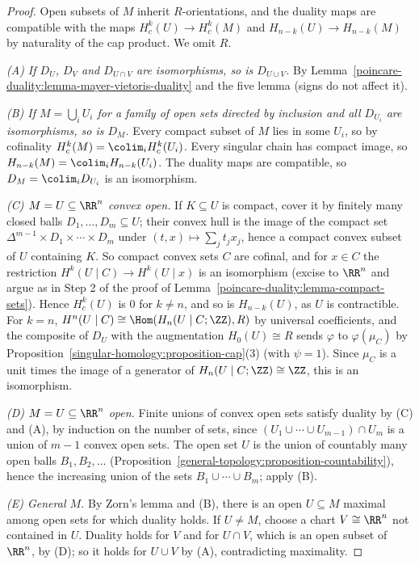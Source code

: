 \begin{proof}
Open subsets of $M$ inherit $R$-orientations, and the duality maps are compatible with the maps $H^k_c(U) \to H^k_c(M)$ and $H_{n-k}(U) \to H_{n-k}(M)$ by naturality of
the cap product. We omit $R$.

\emph{(A) If $D_U$, $D_V$ and $D_{U \cap V}$ are isomorphisms, so is $D_{U \cup V}$.} By Lemma~\ref{poincare-duality:lemma-mayer-vietoris-duality} and the five lemma (signs do
not affect it).

\emph{(B) If $M = \bigcup_i U_i$ for a family of open sets directed by inclusion and all $D_{U_i}$ are isomorphisms, so is $D_M$.} Every compact subset of $M$ lies in some
$U_i$, so by cofinality $H^k_c(M) = \colim_i H^k_c(U_i)$. Every singular chain has compact image, so $H_{n-k}(M) = \colim_i H_{n-k}(U_i)$. The duality maps are compatible,
so $D_M = \colim_i D_{U_i}$ is an isomorphism.

\emph{(C) $M = U \subseteq \RR^n$ convex open.} If $K \subseteq U$ is compact, cover it by finitely many closed balls $D_1, \ldots, D_m \subseteq U$; their convex hull is the image of the
compact set $\Delta^{m-1} \times D_1 \times \cdots \times D_m$ under $(t, x) \mapsto \sum_j t_jx_j$, hence a compact convex subset of $U$ containing $K$. So compact convex sets $C$ are
cofinal, and for $x \in C$ the restriction $H^k(U \mid C) \to H^k(U \mid x)$ is an isomorphism (excise to $\RR^n$ and argue as in Step 2 of the proof of
Lemma~\ref{poincare-duality:lemma-compact-sets}). Hence $H^k_c(U)$ is $0$ for $k \neq n$, and so is $H_{n-k}(U)$, as $U$ is contractible. For $k = n$, $H^n(U \mid C) \cong \Hom(H_n(U \mid C; \ZZ), R)$
by universal coefficients, and the composite of $D_U$ with the augmentation $H_0(U) \cong R$ sends $\varphi$ to $\varphi(\mu_C)$ by Proposition~\ref{singular-homology:proposition-cap}(3)
(with $\psi = 1$). Since $\mu_C$ is a unit times the image of a generator of $H_n(U \mid C; \ZZ) \cong \ZZ$, this is an isomorphism.

\emph{(D) $M = U \subseteq \RR^n$ open.} Finite unions of convex open sets satisfy duality by (C) and (A), by induction on the number of sets, since
$(U_1 \cup \cdots \cup U_{m-1}) \cap U_m$ is a union of $m - 1$ convex open sets. The open set $U$ is the union of countably many open balls $B_1, B_2, \ldots$
(Proposition~\ref{general-topology:proposition-countability}), hence the increasing union of the sets $B_1 \cup \cdots \cup B_m$; apply (B).

\emph{(E) General $M$.} By Zorn's lemma and (B), there is an open $U \subseteq M$ maximal among open sets for which duality holds. If $U \neq M$, choose a chart $V \cong \RR^n$ not contained in
$U$. Duality holds for $V$ and for $U \cap V$, which is an open subset of $\RR^n$, by (D); so it holds for $U \cup V$ by (A), contradicting maximality.
\end{proof}

